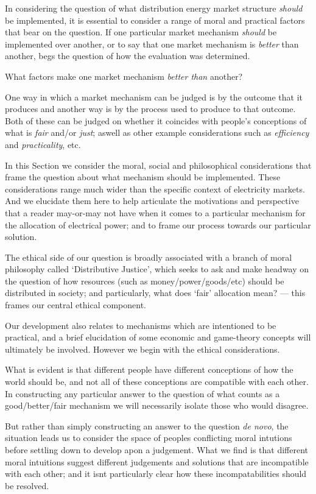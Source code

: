 \documentclass{article}
\begin{document}
In considering the question of what distribution energy market structure \textit{should} be implemented, it is essential to consider a range of moral and practical factors that bear on the question.
If one particular market mechanism \textit{should} be implemented over another,
or to say that one market mechanism is \textit{better} than another, begs the question of how the evaluation was determined.

What factors make one market mechanism \textit{better than} another?

One way in which a market mechanism can be judged is by the outcome that it produces and another way is by the process used to produce to that outcome.
Both of these can be judged on whether it coincides with people's conceptions of what is \textit{fair} and/or \textit{just}; aswell as other example considerations such as \textit{efficiency} and \textit{practicality}, etc.

In this Section we consider the moral, social and philosophical considerations that frame the question about what mechanism should be implemented.
These considerations range much wider than the specific context of electricity markets. And we elucidate them here to help articulate the motivations and perspective that a reader may-or-may not have when it comes to a particular mechanism for the allocation of electrical power; and to frame our process towards our particular solution.

The ethical side of our question is broadly associated with a branch of moral philosophy called `Distributive Justice', which seeks to ask and make headway on the question of how resources (such as money/power/goods/etc) should be distributed in society; and particularly, what does `fair' allocation mean? --- this frames our central ethical component.

Our development also relates to mechanisms which are intentioned to be practical, and a brief elucidation of some economic and game-theory concepts will ultimately be involved. However we begin with the ethical considerations.

What is evident is that different people have different conceptions of how the world should be, and not all of these conceptions are compatible with each other.
In constructing any particular answer to the question of what counts as a good/better/fair mechanism we will necessarily isolate those who would disagree.

But rather than simply constructing an answer to the question \textit{de novo}, the situation leads us to consider the space of peoples conflicting moral intutions before settling down to develop apon a judgement.
What we find is that different moral intuitions suggest different judgements and solutions that are incompatible with each other; and it isnt particularly clear how these incompatabilities should be resolved.
\end{document}
